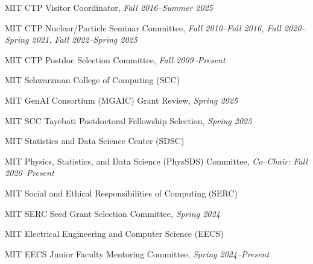 \item MIT CTP Visitor Coordinator, \emph{Fall 2016--Summer 2025}
\item MIT CTP Nuclear/Particle Seminar Committee, \emph{Fall 2010--Fall 2016, Fall 2020--Spring 2021, Fall 2022--Spring 2025}
\item MIT CTP Postdoc Selection Committee, \emph{Fall 2009--Present}
\el 
\item MIT Schwarzman College of Computing (SCC)
\bsbl 
\item MIT GenAI Consortium (MGAIC) Grant Review, \emph{Spring 2025}
\item MIT SCC Tayebati Postdoctoral Fellowship Selection, \emph{Spring 2025}
\el 
\item MIT Statistics and Data Science Center (SDSC)
\bsbl 
\item MIT Physics, Statistics, and Data Science (PhysSDS) Committee, \emph{Co--Chair: Fall 2020--Present}
\el 
\item MIT Social and Ethical Responsibilities of Computing (SERC)
\bsbl 
\item MIT SERC Seed Grant Selection Committee, \emph{Spring 2024}
\el 
\item MIT Electrical Engineering and Computer Science (EECS)
\bsbl 
\item MIT EECS Junior Faculty Mentoring Committee, \emph{Spring 2024--Present}
\el 
\el
